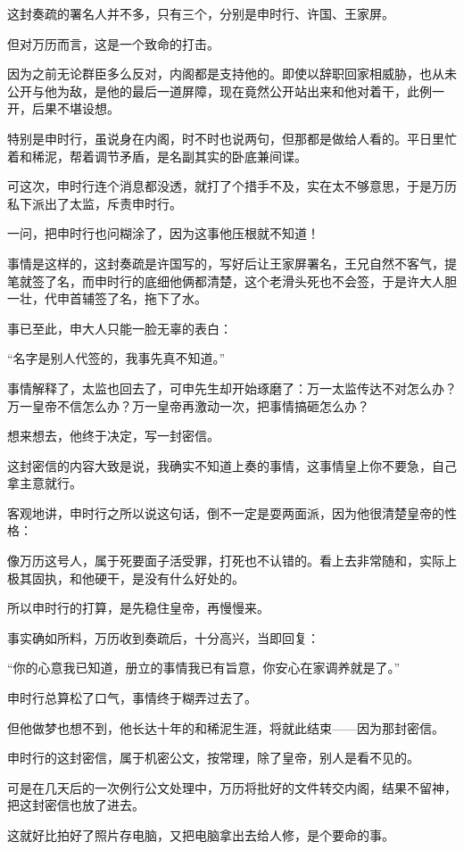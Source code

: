 \begin{multicols}{\theparacolNo}
这封奏疏的署名人并不多，只有三个，分别是申时行、许国、王家屏。

但对万历而言，这是一个致命的打击。

因为之前无论群臣多么反对，内阁都是支持他的。即使以辞职回家相威胁，也从未公开与他为敌，是他的最后一道屏障，现在竟然公开站出来和他对着干，此例一开，后果不堪设想。

特别是申时行，虽说身在内阁，时不时也说两句，但那都是做给人看的。平日里忙着和稀泥，帮着调节矛盾，是名副其实的卧底兼间谍。

可这次，申时行连个消息都没透，就打了个措手不及，实在太不够意思，于是万历私下派出了太监，斥责申时行。

一问，把申时行也问糊涂了，因为这事他压根就不知道！

事情是这样的，这封奏疏是许国写的，写好后让王家屏署名，王兄自然不客气，提笔就签了名，而申时行的底细他俩都清楚，这个老滑头死也不会签，于是许大人胆一壮，代申首辅签了名，拖下了水。

事已至此，申大人只能一脸无辜的表白：

“名字是别人代签的，我事先真不知道。”

事情解释了，太监也回去了，可申先生却开始琢磨了：万一太监传达不对怎么办？万一皇帝不信怎么办？万一皇帝再激动一次，把事情搞砸怎么办？

想来想去，他终于决定，写一封密信。

这封密信的内容大致是说，我确实不知道上奏的事情，这事情皇上你不要急，自己拿主意就行。

客观地讲，申时行之所以说这句话，倒不一定是耍两面派，因为他很清楚皇帝的性格：

像万历这号人，属于死要面子活受罪，打死也不认错的。看上去非常随和，实际上极其固执，和他硬干，是没有什么好处的。

所以申时行的打算，是先稳住皇帝，再慢慢来。

事实确如所料，万历收到奏疏后，十分高兴，当即回复：

“你的心意我已知道，册立的事情我已有旨意，你安心在家调养就是了。”

申时行总算松了口气，事情终于糊弄过去了。

但他做梦也想不到，他长达十年的和稀泥生涯，将就此结束——因为那封密信。

申时行的这封密信，属于机密公文，按常理，除了皇帝，别人是看不见的。

可是在几天后的一次例行公文处理中，万历将批好的文件转交内阁，结果不留神，把这封密信也放了进去。

这就好比拍好了照片存电脑，又把电脑拿出去给人修，是个要命的事。


\end{multicols}
